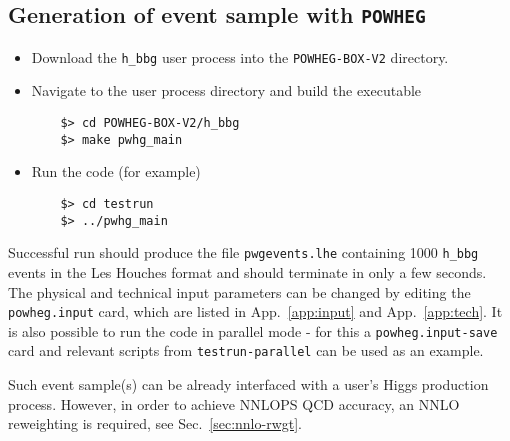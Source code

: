 \documentclass[11pt,a4paper]{article}\pdfoutput=1
\newcommand{\POWHEG}{{\tt{POWHEG}}}
\newcommand{\POWHEGBOXVTWO}{{\tt{POWHEG-BOX-V2}}}
\newcommand{\hbbg}{{\tt{h\_bbg}}}
\begin{document}
\subsection{Generation of event sample with \POWHEG{}}
\label{sec:generation_1}
\begin{itemize}
  \renewcommand{\labelitemi}{$\rightarrow$}
\item Download the \hbbg{} user process into the \POWHEGBOXVTWO{} directory.
\item Navigate to the user process directory and build the executable
  \begin{lstlisting}
    $> cd POWHEG-BOX-V2/h_bbg
    $> make pwhg_main
  \end{lstlisting}
\item Run the code (for example)
  \begin{lstlisting}
    $> cd testrun
    $> ../pwhg_main
  \end{lstlisting}
\end{itemize}
Successful run should produce the file {\tt{pwgevents.lhe}} containing
1000 \hbbg{} events in the Les Houches format and should terminate in
only a few seconds. The physical and technical input parameters can
be changed by editing the {\tt{powheg.input}} card, which are listed
in App.~\ref{app:input} and App.~\ref{app:tech}. It is also possible
to run the code in parallel mode - for this a {\tt{powheg.input-save}}
card and relevant scripts from {\tt{testrun-parallel}} can be used as
an example.

Such event sample(s) can be already interfaced with a user's Higgs
production process. However, in order to achieve NNLOPS QCD accuracy,
an NNLO reweighting is required, see Sec.~\ref{sec:nnlo-rwgt}.


\end{document}
